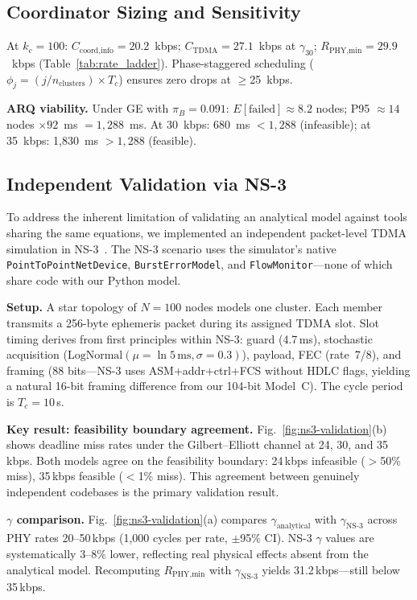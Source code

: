 \documentclass[journal]{IEEEtran}
\begin{document}
\subsection{Coordinator Sizing and Sensitivity}

At $k_c = 100$: $C_{\text{coord,info}} = 20.2$~kbps; $C_{\text{TDMA}} = 27.1$~kbps at $\gamma_{30}$; $R_{\text{PHY,min}} = 29.9$~kbps (Table~\ref{tab:rate_ladder}). Phase-staggered scheduling ($\phi_j = (j / n_{\text{clusters}}) \times T_c$) ensures zero drops at $\geq$25~kbps.

\textbf{ARQ viability.} Under GE with $\pi_B = 0.091$: $E[\text{failed}] \approx 8.2$ nodes; P95 $\approx 14$ nodes $\times 92$~ms $= 1{,}288$~ms. At 30~kbps: 680~ms $< 1{,}288$ (infeasible); at 35~kbps: 1,830~ms $> 1{,}288$ (feasible).

\subsection{Independent Validation via NS-3}
\label{sec:ns3-validation}

To address the inherent limitation of validating an analytical model against tools sharing the same equations, we implemented an independent packet-level TDMA simulation in NS-3~\cite{ns3}. The NS-3 scenario uses the simulator's native \texttt{PointToPointNetDevice}, \texttt{BurstErrorModel}, and \texttt{FlowMonitor}---none of which share code with our Python model.

\textbf{Setup.} A star topology of $N{=}100$ nodes models one cluster. Each member transmits a 256-byte ephemeris packet during its assigned TDMA slot. Slot timing derives from first principles within NS-3: guard (4.7\,ms), stochastic acquisition ($\mathrm{LogNormal}(\mu{=}\ln 5\,\mathrm{ms},\sigma{=}0.3)$), payload, FEC (rate~7/8), and framing (88 bits---NS-3 uses ASM+addr+ctrl+FCS without HDLC flags, yielding a natural 16-bit framing difference from our 104-bit Model~C). The cycle period is $T_c{=}10$\,s.

\textbf{Key result: feasibility boundary agreement.} Fig.~\ref{fig:ns3-validation}(b) shows deadline miss rates under the Gilbert--Elliott channel at 24, 30, and 35\,kbps. Both models agree on the feasibility boundary: 24\,kbps infeasible ($>$50\% miss), 35\,kbps feasible ($<$1\% miss). This agreement between genuinely independent codebases is the primary validation result.

\textbf{$\gamma$ comparison.} Fig.~\ref{fig:ns3-validation}(a) compares $\gamma_{\mathrm{analytical}}$ with $\gamma_{\mathrm{NS\text{-}3}}$ across PHY rates 20--50\,kbps (1{,}000 cycles per rate, $\pm$95\% CI). NS-3 $\gamma$ values are systematically 3--8\% lower, reflecting real physical effects absent from the analytical model. Recomputing $R_{\text{PHY,min}}$ with $\gamma_{\text{NS-3}}$ yields 31.2\,kbps---still below 35\,kbps.
\end{document}
